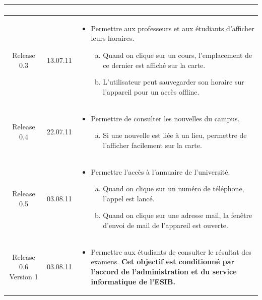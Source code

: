 \begin{longtable}{|c|l|p{10cm}|}
\begin{itemize}
\begin{enumerate}[a)]
	 	 			\end{enumerate}
		 	\end{itemize}   \\ 
		 \hline  Release 0.3 & 13.07.11  & 
 		 	\begin{itemize}
 		 	 		\item Permettre aux professeurs et aux étudiants d'afficher leurs horaires.
	 		 	 	\begin{enumerate}[a)]
	 		 	 			\item Quand on clique sur un cours, l'emplacement de ce dernier est affiché sur la carte.
	 		 	 			\item L'utilisateur peut sauvegarder son horaire sur l'appareil pour un accès offline.
	 		 	 		\end{enumerate}
 		 	\end{itemize}   \\ 
		\hline  Release 0.4 & 22.07.11  & 
 		 	\begin{itemize}
 		 	 		\item Permettre de consulter les nouvelles du campus.
	 		 	 	\begin{enumerate}[a)]
	 		 	 			\item Si une nouvelle est liée à un lieu, permettre de l'afficher facilement sur la carte.
	 		 	 		\end{enumerate}
 		 	\end{itemize}   \\
		\hline  Release 0.5 & 03.08.11  & 
 		 	\begin{itemize}
 		 	 		\item Permettre l'accès à l'annuaire de l'université. 
	 		 	 	\begin{enumerate}[a)]
		 	 				\item Quand on clique sur un numéro de téléphone, l'appel est lancé.
		 	 				\item Quand on clique sur une adresse mail, la fenêtre d'envoi de mail de l'appareil est ouverte.
		 	 			\end{enumerate}
 		 	\end{itemize}   \\
	 	\hline  Release 0.6 Version 1 & 03.08.11  & 
 		 	\begin{itemize}
 		 	 		\item Permettre aux étudiants de consulter le résultat des examens. \textbf{Cet objectif est conditionné par l'accord de l'administration et du service informatique de l'\gls{ESIB}.}
 		 	\end{itemize}   \\  

\end{longtable}
